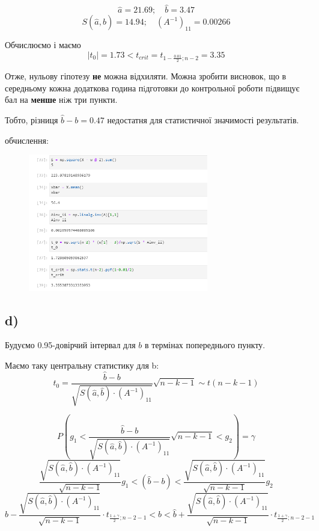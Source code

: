 \documentclass[11pt, a4paper]{article} %
\begin{document}
$$\hat a = 21.69; \quad \hat b = 3.47$$
$$S(\hat a, \hat b) = 14.94; \quad \left(A^{-1}\right)_{11} = 0.00266$$

Обчислюємо і маємо
$$|t_0| = 1.73 < t_{crit} = t_{1-\frac{0.01}{2};n-2} = 3.35$$

Отже, нульову гіпотезу \textbf{не} можна відхиляти. Можна зробити висновок, що в середньому кожна додаткова 
година пiдготовки до контрольної роботи пiдвищує бал на \textbf{менше} нiж три пункти.

Тобто, різниця $\hat b - b = 0.47$ недостатня для статистичної значимості результатів.

обчислення:
\begin{figure}[h]
    \centering
    \includegraphics[width=0.7\textwidth]{task5.c.png}
\end{figure}

\subsection*{d)}
Будуємо 0.95-довірчий інтервал для $b$ в термінах попереднього пункту.

Маємо таку центральну статистику для b:
$$t_0 = \frac{\hat b - b}{\sqrt{S(\hat a, \hat b) \cdot \left(A^{-1}\right)_{11}}}\sqrt{n-k-1} \sim t(n-k-1)$$

$$P(g_1 < \frac{\hat b - b}{\sqrt{S(\hat a, \hat b) \cdot \left(A^{-1}\right)_{11}}}\sqrt{n-k-1} < g_2) = \gamma$$
$$\frac{\sqrt{S(\hat a, \hat b) \cdot \left(A^{-1}\right)_{11}}}{\sqrt{n-k-1}} g_1 < (\hat b - b) < \frac{\sqrt{S(\hat a, \hat b) \cdot \left(A^{-1}\right)_{11}}}{\sqrt{n-k-1}} g_2$$
$$\hat b - \frac{\sqrt{S(\hat a, \hat b) \cdot \left(A^{-1}\right)_{11}}}{\sqrt{n-k-1}} \cdot t_{\frac{1+\gamma}{2};n-2-1} < b < \hat b + \frac{\sqrt{S(\hat a, \hat b) \cdot \left(A^{-1}\right)_{11}}}{\sqrt{n-k-1}} \cdot t_{\frac{1+\gamma}{2};n-2-1}$$
\end{document}
